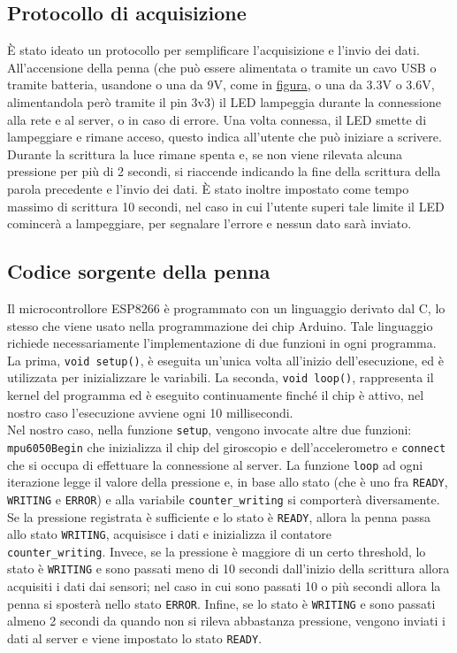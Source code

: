 \documentclass[8pt,notitlepage]{report}
\begin{document}
		\subsection{Protocollo di acquisizione}
			È stato ideato un protocollo per semplificare l'acquisizione e l'invio dei dati. All'accensione della penna (che può essere alimentata o tramite un cavo USB o tramite batteria, usandone o una da 9V, come in \hyperref[figure:circuito]{figura}, o una da 3.3V o 3.6V, alimentandola però tramite il pin 3v3) il LED lampeggia durante la connessione alla rete e al server, o in caso di errore. Una volta connessa, il LED smette di lampeggiare e rimane acceso, questo indica all'utente che può iniziare a scrivere. Durante la scrittura la luce rimane spenta e, se non viene rilevata alcuna pressione per più di 2 secondi, si riaccende indicando la fine della scrittura della parola precedente e l'invio dei dati. È stato inoltre impostato come tempo massimo di scrittura 10 secondi, nel caso in cui l'utente superi tale limite il LED comincerà a lampeggiare, per segnalare l'errore e nessun dato sarà inviato.
		
		\subsection{Codice sorgente della penna}
			Il microcontrollore ESP8266 è programmato con un linguaggio derivato dal C, lo stesso che viene usato nella programmazione dei chip Arduino. Tale linguaggio richiede necessariamente l'implementazione di due funzioni in ogni programma. \\
			La prima, \verb|void setup()|, è eseguita un'unica volta all'inizio dell'esecuzione, ed è utilizzata per inizializzare le variabili. La seconda, \verb|void loop()|, rappresenta il kernel del programma ed è eseguito continuamente finché il chip è attivo, nel nostro caso l'esecuzione avviene ogni 10 millisecondi. \\
			Nel nostro caso, nella funzione \verb|setup|, vengono invocate altre due funzioni: \verb|mpu6050Begin| che inizializza il chip del giroscopio e dell'accelerometro e \verb|connect| che si occupa di effettuare la connessione al server. La funzione \verb|loop| ad ogni iterazione legge il valore della pressione e, in base allo stato (che è uno fra \verb|READY|, \verb|WRITING| e \verb|ERROR|) e alla variabile \verb|counter_writing| si comporterà diversamente. \\ Se la pressione registrata è sufficiente e lo stato è \verb|READY|, allora la penna passa allo stato \verb|WRITING|, acquisisce i dati e inizializza il contatore \\ \verb|counter_writing|. Invece, se la pressione è maggiore di un certo threshold, lo stato è \verb|WRITING| e sono passati meno di 10 secondi dall'inizio della scrittura allora acquisiti i dati dai sensori; nel caso in cui sono passati 10 o più secondi allora la penna si sposterà nello stato \verb|ERROR|. Infine, se lo stato è \verb|WRITING| e sono passati almeno 2 secondi da quando non si rileva abbastanza pressione, vengono inviati i dati al server e viene impostato lo stato \verb|READY|. 
			
\end{document}
